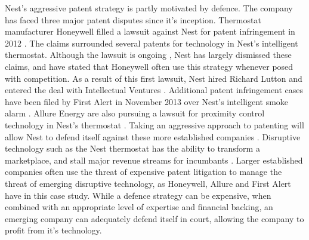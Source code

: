 Nest's aggressive patent strategy is partly motivated by defence. 
The company has faced three major patent disputes since it's inception.
Thermostat manufacturer Honeywell filled a lawsuit against Nest for patent infringement in 2012 \cite{NestHoneywellGig, NestHoneywellVerge, NestHoneywell}.
The claims surrounded several patents for technology in Nest's intelligent thermostat.
Although the lawsuit is ongoing \cite{NestFirstVerge}, Nest has largely dismissed these claims, and have stated that Honeywell often use this strategy whenever posed with competition.
As a result of this first lawsuit, Nest hired Richard Lutton and entered the deal with Intellectual Ventures \cite{NestFirstGig}.
Additional patent infringement cases have been filed by First Alert in November 2013 over Nest's intelligent smoke alarm \cite{NestFirstVerge, NestFirstGig}.
Allure Energy are also pursuing a lawsuit for proximity control technology in Nest's thermostat \cite{NestAllureCnet}.
Taking an aggressive approach to patenting will allow Nest to defend itself against these more established companies \cite{NestAllureCnet}.
Disruptive technology such as the Nest thermostat has the ability to transform a marketplace, and stall major revenue streams for incumbants \cite{NestCoLabs}. 
Larger established companies often use the threat of expensive patent litigation to manage the threat of emerging disruptive technology, as Honeywell, Allure and First Alert have in this case study.
While a defence strategy can be expensive, when combined with an appropriate level of expertise and financial backing, an emerging company can adequately defend itself in court, allowing the company to profit from it's technology.








